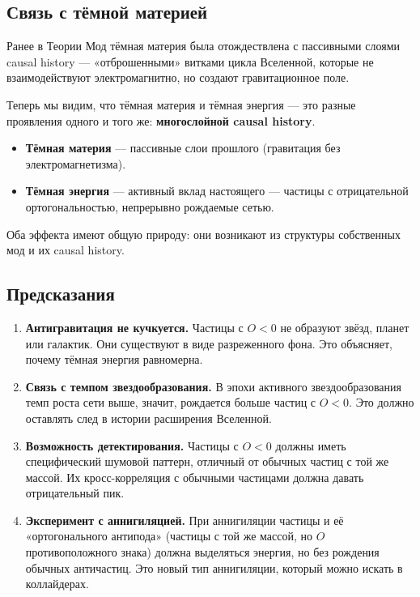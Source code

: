 \documentclass[12pt,a4paper]{article}
\begin{document}
\subsection{Связь с тёмной материей}
Ранее в Теории Мод тёмная материя была отождествлена с пассивными слоями causal history --- «отброшенными» витками цикла Вселенной, которые не взаимодействуют электромагнитно, но создают гравитационное поле.

Теперь мы видим, что тёмная материя и тёмная энергия --- это разные проявления одного и того же: \textbf{многослойной causal history}.

\begin{itemize}
    \item \textbf{Тёмная материя} --- пассивные слои прошлого (гравитация без электромагнетизма).
    \item \textbf{Тёмная энергия} --- активный вклад настоящего --- частицы с отрицательной ортогональностью, непрерывно рождаемые сетью.
\end{itemize}

Оба эффекта имеют общую природу: они возникают из структуры собственных мод и их causal history.

\subsection{Предсказания}
\begin{enumerate}[label=\arabic*.]
    \item \textbf{Антигравитация не кучкуется.} Частицы с $O < 0$ не образуют звёзд, планет или галактик. Они существуют в виде разреженного фона. Это объясняет, почему тёмная энергия равномерна.
    \item \textbf{Связь с темпом звездообразования.} В эпохи активного звездообразования темп роста сети выше, значит, рождается больше частиц с $O < 0$. Это должно оставлять след в истории расширения Вселенной.
    \item \textbf{Возможность детектирования.} Частицы с $O < 0$ должны иметь специфический шумовой паттерн, отличный от обычных частиц с той же массой. Их кросс-корреляция с обычными частицами должна давать отрицательный пик.
    \item \textbf{Эксперимент с аннигиляцией.} При аннигиляции частицы и её «ортогонального антипода» (частицы с той же массой, но $O$ противоположного знака) должна выделяться энергия, но без рождения обычных античастиц. Это новый тип аннигиляции, который можно искать в коллайдерах.
\end{enumerate}
\end{document}
